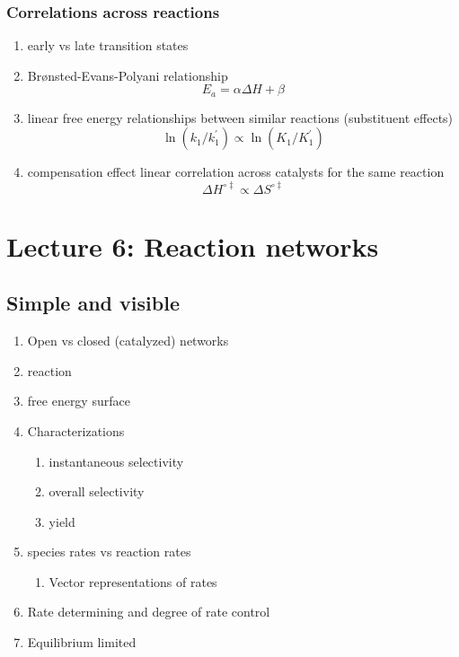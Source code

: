 \documentclass[11pt]{article}
\begin{document}
\subsubsection{Correlations across reactions}
\label{sec:orgbda3545}
\begin{enumerate}
\item early vs late transition states
\item Br\o{}nsted-Evans-Polyani relationship
\[ E_a = \alpha \Delta H + \beta \]
\item linear free energy relationships between similar reactions (substituent effects)
\[ \ln (k_1/k_1^\prime) \propto \ln (K_1/K_1^\prime) \]
\item compensation effect linear correlation across catalysts for the same reaction
\[\Delta H^{\circ\ddagger} \propto \Delta S^{\circ\ddagger}\]
\end{enumerate}
\section{Lecture 6: Reaction networks}
\label{sec:org2c68bbb}

\subsection{Simple and visible}
\label{sec:orge992b57}
\begin{enumerate}
\item Open vs closed (catalyzed) networks
\item {} reaction
\item free energy surface
\item Characterizations
\begin{enumerate}
\item instantaneous selectivity
\item overall selectivity
\item yield
\end{enumerate}
\item species rates vs reaction rates
\begin{enumerate}
\item Vector representations of rates
\end{enumerate}
\item Rate determining and degree of rate control
\item Equilibrium limited
\end{enumerate}
\end{document}
